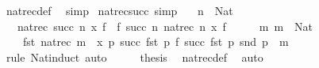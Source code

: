 \begin{isabellebody}
\ nat{\isacharunderscore}{\kern0pt}rec{\isacharprime}{\kern0pt}{\isacharunderscore}{\kern0pt}def\ \isamarkupfalse%
\ simp%
\endisatagproof
{\isafoldproof}%
%
\isadelimproof
\isanewline
%
\endisadelimproof
\isanewline
{}\isamarkupfalse%
\ nat{\isacharunderscore}{\kern0pt}rec{\isacharprime}{\kern0pt}{\isacharunderscore}{\kern0pt}succ\ {\isacharbrackleft}{\kern0pt}simp{\isacharbrackright}{\kern0pt}{\isacharcolon}{\kern0pt}\isanewline
\ \ \ {\isachardoublequoteopen}n\ {\isacharcolon}{\kern0pt}\ Nat{\isachardoublequoteclose}\isanewline
\ \ \ {\isachardoublequoteopen}nat{\isacharunderscore}{\kern0pt}rec{\isacharprime}{\kern0pt}\ {\isacharparenleft}{\kern0pt}succ\ n{\isacharparenright}{\kern0pt}\ x\ f\ {\isacharequal}{\kern0pt}\ f\ {\isacharparenleft}{\kern0pt}succ\ n{\isacharparenright}{\kern0pt}\ {\isacharparenleft}{\kern0pt}nat{\isacharunderscore}{\kern0pt}rec{\isacharprime}{\kern0pt}\ n\ x\ f{\isacharparenright}{\kern0pt}{\isachardoublequoteclose}\isanewline
%
\isadelimproof
%
\endisadelimproof
%
\isatagproof
{}\isamarkupfalse%
\ {\isacharminus}{\kern0pt}\isanewline
\ \ \isamarkupfalse%
\ {\isachardoublequoteopen}{\isasymAnd}m{\isachardot}{\kern0pt}\ m\ {\isacharcolon}{\kern0pt}\ Nat\ {\isasymLongrightarrow}\isanewline
\ \ \ \ fst\ {\isacharparenleft}{\kern0pt}nat{\isacharunderscore}{\kern0pt}rec\ m\ {\isasymlangle}{}{\isacharcomma}{\kern0pt}\ x\ {\isacharparenleft}{\kern0pt}{\isasymlambda}p{\isachardot}{\kern0pt}\ {\isasymlangle}succ\ {\isacharparenleft}{\kern0pt}fst\ p{\isacharparenright}{\kern0pt}{\isacharcomma}{\kern0pt}\ f\ {\isacharparenleft}{\kern0pt}succ\ {\isacharparenleft}{\kern0pt}fst\ p{\isacharparenright}{\kern0pt}{\isacharparenright}{\kern0pt}\ {\isacharparenleft}{\kern0pt}snd\ p{\isacharparenright}{\kern0pt}{\isasymrangle}{\isacharparenright}{\kern0pt}{\isacharparenright}{\kern0pt}\ {\isacharequal}{\kern0pt}\ m{\isachardoublequoteclose}\isanewline
\ \ \ \ \isamarkupfalse%
\ {\isacharparenleft}{\kern0pt}rule\ Nat{\isacharunderscore}{\kern0pt}induct{\isacharparenright}{\kern0pt}\ auto\isanewline
\ \ \isamarkupfalse%
\ \isamarkupfalse%
\ {\isacharquery}{\kern0pt}thesis\ \isamarkupfalse%
\ nat{\isacharunderscore}{\kern0pt}rec{\isacharprime}{\kern0pt}{\isacharunderscore}{\kern0pt}def\ \isamarkupfalse%
\ auto\isanewline
{}\isamarkupfalse%
%
\endisatagproof

\end{isabellebody}
